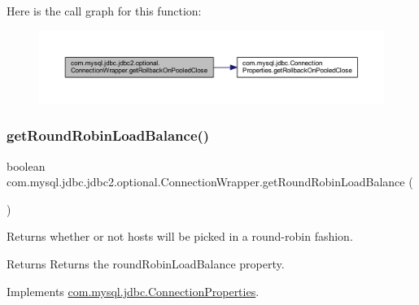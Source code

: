 Here is the call graph for this function\+:
\nopagebreak
\begin{figure}[H]
\begin{center}
\leavevmode
\includegraphics[width=350pt]{classcom_1_1mysql_1_1jdbc_1_1jdbc2_1_1optional_1_1_connection_wrapper_ada2984ed24a32bb5d13aff48689757d9_cgraph}
\end{center}
\end{figure}
\mbox{\label{classcom_1_1mysql_1_1jdbc_1_1jdbc2_1_1optional_1_1_connection_wrapper_ac03ab6e1fcc1af0837d88f0db05b1407}} 
\subsubsection{\texorpdfstring{get\+Round\+Robin\+Load\+Balance()}{getRoundRobinLoadBalance()}}
{\footnotesize\ttfamily boolean com.\+mysql.\+jdbc.\+jdbc2.\+optional.\+Connection\+Wrapper.\+get\+Round\+Robin\+Load\+Balance (\begin{DoxyParamCaption}{ }\end{DoxyParamCaption})}

Returns whether or not hosts will be picked in a round-\/robin fashion.

\begin{DoxyReturn}{Returns}
Returns the round\+Robin\+Load\+Balance property. 
\end{DoxyReturn}


Implements \mbox{\hyperlink{interfacecom_1_1mysql_1_1jdbc_1_1_connection_properties_a48b88c077dbb42077a1fb257aab4558f}{com.\+mysql.\+jdbc.\+Connection\+Properties}}.

